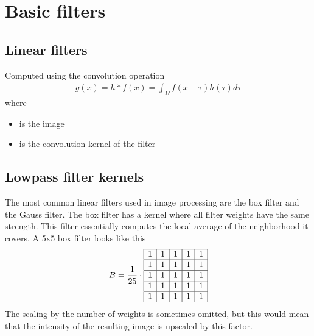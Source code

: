 \documentclass[letterpaper,10pt,english]{sphinxmanual}
\begin{document}
\chapter{Basic filters}
\label{\detokenize{02-ImageEnhancement:basic-filters}}

\section{Linear filters}
\label{\detokenize{02-ImageEnhancement:linear-filters}}
\sphinxAtStartPar
Computed using the convolution operation
\begin{equation*}
\begin{split}g(x)=h*f(x)=\int_{\Omega}f(x-\tau) h(\tau) d\tau\end{split}
\end{equation*}
\sphinxAtStartPar
where
\begin{itemize}
\item {} 
\sphinxAtStartPar
{} is the image

\item {} 
\sphinxAtStartPar
{} is the convolution kernel of the filter

\end{itemize}




\section{Low\sphinxhyphen{}pass filter kernels}
\label{\detokenize{02-ImageEnhancement:low-pass-filter-kernels}}
\sphinxAtStartPar
The most common linear filters used in image processing are the box filter and the Gauss filter. The box filter has a kernel where all filter weights have the same strength. This filter essentially computes the local average of the neighborhood it covers.
A 5x5 box filter looks like this
\begin{equation*}
\begin{split}B=\frac{1}{25}\cdot\begin{array}{|c|c|c|c|c|}
\hline
1 & 1 & 1 & 1& 1\\
\hline
1 & 1 & 1 & 1& 1\\
\hline
1 & 1 & 1 & 1& 1\\
\hline
1 & 1 & 1 & 1& 1\\
\hline
1 & 1 & 1 & 1& 1\\
\hline
\end{array}
\end{split}
\end{equation*}
\sphinxAtStartPar
The scaling by the number of weights is sometimes omitted, but this would mean that the intensity of the resulting image is upscaled by this factor.
\end{document}
